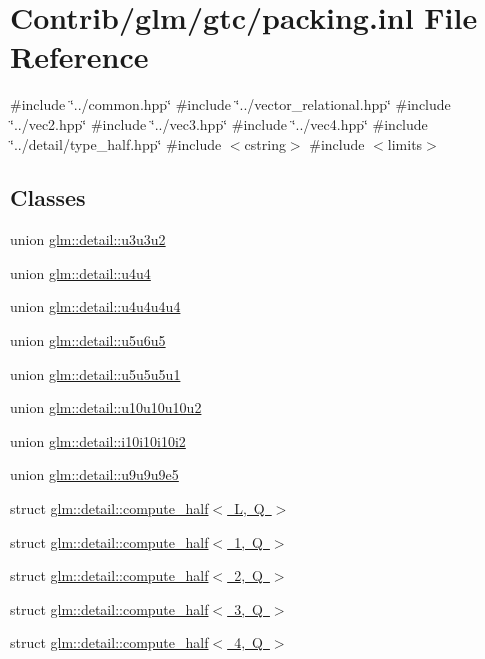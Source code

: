\hypertarget{packing_8inl}{}\section{Contrib/glm/gtc/packing.inl File Reference}
\label{packing_8inl}
{\ttfamily \#include \char`\"{}../common.\+hpp\char`\"{}}\newline
{\ttfamily \#include \char`\"{}../vector\+\_\+relational.\+hpp\char`\"{}}\newline
{\ttfamily \#include \char`\"{}../vec2.\+hpp\char`\"{}}\newline
{\ttfamily \#include \char`\"{}../vec3.\+hpp\char`\"{}}\newline
{\ttfamily \#include \char`\"{}../vec4.\+hpp\char`\"{}}\newline
{\ttfamily \#include \char`\"{}../detail/type\+\_\+half.\+hpp\char`\"{}}\newline
{\ttfamily \#include $<$cstring$>$}\newline
{\ttfamily \#include $<$limits$>$}\newline
\subsection*{Classes}
\begin{DoxyCompactItemize}
\item 
union \mbox{\hyperlink{unionglm_1_1detail_1_1u3u3u2}{glm\+::detail\+::u3u3u2}}
\item 
union \mbox{\hyperlink{unionglm_1_1detail_1_1u4u4}{glm\+::detail\+::u4u4}}
\item 
union \mbox{\hyperlink{unionglm_1_1detail_1_1u4u4u4u4}{glm\+::detail\+::u4u4u4u4}}
\item 
union \mbox{\hyperlink{unionglm_1_1detail_1_1u5u6u5}{glm\+::detail\+::u5u6u5}}
\item 
union \mbox{\hyperlink{unionglm_1_1detail_1_1u5u5u5u1}{glm\+::detail\+::u5u5u5u1}}
\item 
union \mbox{\hyperlink{unionglm_1_1detail_1_1u10u10u10u2}{glm\+::detail\+::u10u10u10u2}}
\item 
union \mbox{\hyperlink{unionglm_1_1detail_1_1i10i10i10i2}{glm\+::detail\+::i10i10i10i2}}
\item 
union \mbox{\hyperlink{unionglm_1_1detail_1_1u9u9u9e5}{glm\+::detail\+::u9u9u9e5}}
\item 
struct \mbox{\hyperlink{structglm_1_1detail_1_1compute__half}{glm\+::detail\+::compute\+\_\+half$<$ L, Q $>$}}
\item 
struct \mbox{\hyperlink{structglm_1_1detail_1_1compute__half_3_011_00_01_q_01_4}{glm\+::detail\+::compute\+\_\+half$<$ 1, Q $>$}}
\item 
struct \mbox{\hyperlink{structglm_1_1detail_1_1compute__half_3_012_00_01_q_01_4}{glm\+::detail\+::compute\+\_\+half$<$ 2, Q $>$}}
\item 
struct \mbox{\hyperlink{structglm_1_1detail_1_1compute__half_3_013_00_01_q_01_4}{glm\+::detail\+::compute\+\_\+half$<$ 3, Q $>$}}
\item 
struct \mbox{\hyperlink{structglm_1_1detail_1_1compute__half_3_014_00_01_q_01_4}{glm\+::detail\+::compute\+\_\+half$<$ 4, Q $>$}}
\end{DoxyCompactItemize}
